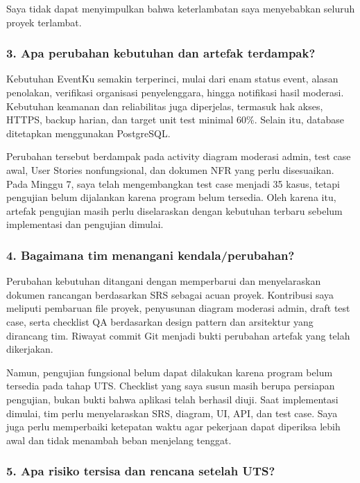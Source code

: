 \documentclass[11pt,a4paper]{article}
\begin{document}
Saya tidak dapat menyimpulkan bahwa keterlambatan saya menyebabkan seluruh proyek terlambat.

\subsubsection*{3. Apa perubahan kebutuhan dan artefak terdampak?}

Kebutuhan EventKu semakin terperinci, mulai dari enam status event, alasan penolakan, verifikasi organisasi penyelenggara, hingga notifikasi hasil moderasi. Kebutuhan keamanan dan reliabilitas juga diperjelas, termasuk hak akses, HTTPS, backup harian, dan target unit test minimal 60\%. Selain itu, database ditetapkan menggunakan PostgreSQL.

Perubahan tersebut berdampak pada activity diagram moderasi admin, test case awal, User Stories nonfungsional, dan dokumen NFR yang perlu disesuaikan. Pada Minggu 7, saya telah mengembangkan test case menjadi 35 kasus, tetapi pengujian belum dijalankan karena program belum tersedia. Oleh karena itu, artefak pengujian masih perlu diselaraskan dengan kebutuhan terbaru sebelum implementasi dan pengujian dimulai.



\subsubsection*{4. Bagaimana tim menangani kendala/perubahan?}

Perubahan kebutuhan ditangani dengan memperbarui dan menyelaraskan dokumen rancangan berdasarkan SRS sebagai acuan proyek. Kontribusi saya meliputi pembaruan file proyek, penyusunan diagram moderasi admin, draft test case, serta checklist QA berdasarkan design pattern dan arsitektur yang dirancang tim. Riwayat commit Git menjadi bukti perubahan artefak yang telah dikerjakan.

Namun, pengujian fungsional belum dapat dilakukan karena program belum tersedia pada tahap UTS. Checklist yang saya susun masih berupa persiapan pengujian, bukan bukti bahwa aplikasi telah berhasil diuji. Saat implementasi dimulai, tim perlu menyelaraskan SRS, diagram, UI, API, dan test case. Saya juga perlu memperbaiki ketepatan waktu agar pekerjaan dapat diperiksa lebih awal dan tidak menambah beban menjelang tenggat.



\subsubsection*{5. Apa risiko tersisa dan rencana setelah UTS?}
\end{document}
